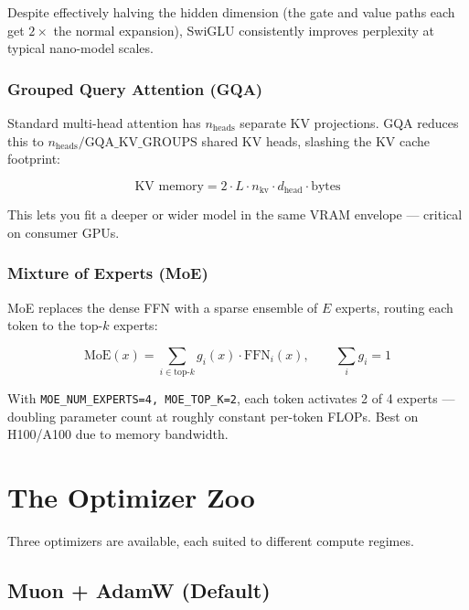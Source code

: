 \documentclass[12pt, a4paper]{article}
\newcommand{\code}[1]{\texttt{#1}}
\begin{document}
Despite effectively halving the hidden dimension (the gate and value paths each get
$2\times$ the normal expansion), SwiGLU consistently improves perplexity at typical
nano-model scales.

\subsubsection{Grouped Query Attention (GQA)}

Standard multi-head attention has $n_{\text{heads}}$ separate KV projections. GQA reduces
this to $n_{\text{heads}} / \text{GQA\_KV\_GROUPS}$ shared KV heads, slashing the KV cache
footprint:

\begin{equation}
  \text{KV memory} = 2 \cdot L \cdot n_{\text{kv}} \cdot d_{\text{head}} \cdot \text{bytes}
\end{equation}

This lets you fit a deeper or wider model in the same VRAM envelope — critical on consumer
GPUs.

\subsubsection{Mixture of Experts (MoE)}

MoE replaces the dense FFN with a sparse ensemble of $E$ experts, routing each token to
the top-$k$ experts:

\begin{equation}
  \text{MoE}(x) = \sum_{i \in \text{top-}k} g_i(x) \cdot \text{FFN}_i(x),
  \qquad \sum_i g_i = 1
\end{equation}

With \code{MOE\_NUM\_EXPERTS=4, MOE\_TOP\_K=2}, each token activates 2 of 4 experts — doubling
parameter count at roughly constant per-token FLOPs. Best on H100/A100 due to memory bandwidth.

\section{The Optimizer Zoo}

Three optimizers are available, each suited to different compute regimes.

\subsection{Muon + AdamW (Default)}
\end{document}
